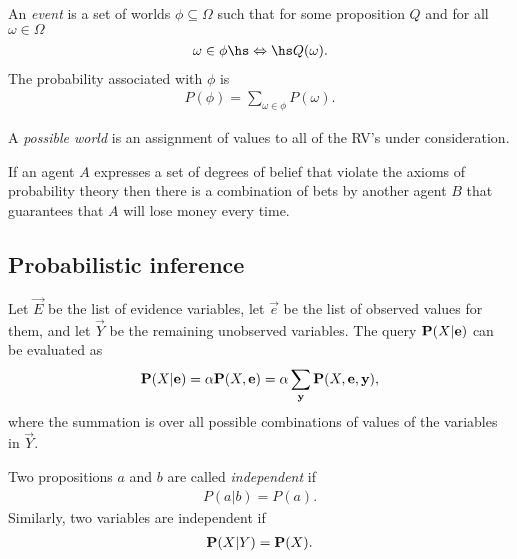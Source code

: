 \documentclass{article}
\begin{document}
\begin{definition}
    An \emph{event} is a set of worlds $\phi\subseteq \Omega$ such that
    for some proposition $Q$ and for all $\omega\in\Omega$
    \begin{align*}
        \omega\in \phi\hs\Leftrightarrow\hs Q(\omega).
    \end{align*}
    The probability associated with $\phi$ is
    \begin{align*}
        P(\phi)=\sum_{\omega\in\phi} P(\omega).
    \end{align*}
\end{definition}

\begin{definition}
    A \emph{possible world} is an assignment of values to all of the RV's
    under consideration.
\end{definition}

\begin{theorem}[De Finetti]
    If an agent $A$ expresses a set of degrees of belief that violate
    the axioms of probability theory then there is a combination of
    bets by another agent $B$ that guarantees that $A$ will lose money
    every time.
\end{theorem}

\subsection{Probabilistic inference}

\begin{lemma}[R\&N p. 493]
    Let $\vec E$ be the list of evidence variables, let $\vec e$ be the list of observed
    values for them, and let $\vec Y$ be the remaining unobserved variables. The query
    $\P(X|\vec e)$ can be evaluated as
    \begin{align*}
        \P(X|\vec e) = \alpha\P(X, \vec e) = \alpha \sum_{\vec y} \P(X,\vec e, \vec y),
    \end{align*}
    where the summation is over all possible combinations of values of the variables in
    $\vec Y$.
\end{lemma}

\begin{definition}[R\&N p. 494]
    Two propositions $a$ and $b$ are called \emph{independent} if
    \begin{align*}
        P(a|b) = P(a).
    \end{align*}
    Similarly, two variables are independent if
    \begin{align*}
        \P(X|Y) = \P(X).
    \end{align*}
\end{definition}
\end{document}
